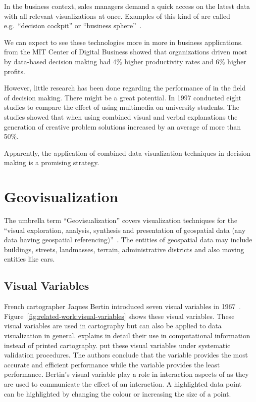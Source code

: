 In the business context, sales managers demand a quick access on the latest data with all relevant visualizations at once.
Examples of this kind of \dss{} are called e.g.\ ``decision cockpit'' or ``business sphere''~\parencite{Davenport2013}.

We can expect to see these technologies more in more in business applications.
\textcite{McAfee2012} from the MIT Center of Digital Business showed that organizations driven most by data-based decision making had 4\% higher productivity rates and 6\% higher profits.

However, little research has been done regarding the performance of \cmvs{} in the field of decision making.
There might be a great potential.
In 1997 \textcite{Mayer1997} conducted eight studies to compare the effect of using multimedia on university students.
The studies showed that when using combined visual and verbal explanations the generation of creative problem solutions increased by an average of more than 50\%.

Apparently, the application of combined data visualization techniques in decision making is a promising strategy.


\section{Geovisualization}
The umbrella term ``Geovisualization'' covers visualization techniques for the ``visual exploration, analysis, synthesis and presentation of geospatial data (any data having geospatial  referencing)''~\parencite{Maceachren2001}.
The entities of geospatial data may include buildings, streets, landmasses, terrain, administrative districts and also moving entities like cars.

\subsection{Visual Variables}\label{sec:related-work:visual-variables}
French cartographer Jaques Bertin introduced seven visual variables in 1967~\parencite{Bertin2010}.
Figure~\ref{fig:related-work:visual-variables} shows these visual variables.
These visual variables are used in cartography but can also be applied to data visualization in general.
\textcite{Carpendale2003} explains in detail their use in computational information instead of printed cartography.
\textcite{Garlandini2009} put these visual variables under systematic validation procedures.
The authors conclude that the variable  provides the most accurate and efficient performance while the variable  provides the least performance.
Bertin's visual variable play a role in interaction aspects of \cmvs{} as they are used to communicate the effect of an interaction.
A highlighted data point can be highlighted by changing the colour or increasing the size of a point.

